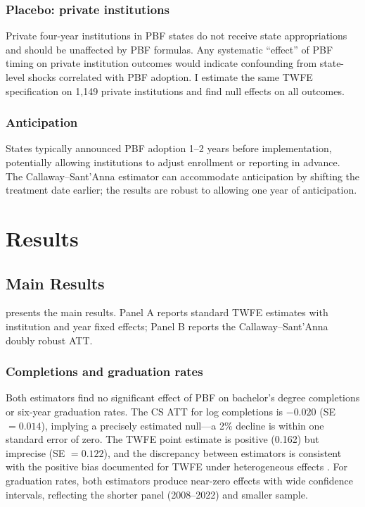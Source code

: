 \documentclass[12pt]{article}
\begin{document}
\subsubsection*{Placebo: private institutions} Private four-year institutions in PBF states do not receive state appropriations and should be unaffected by PBF formulas. Any systematic ``effect'' of PBF timing on private institution outcomes would indicate confounding from state-level shocks correlated with PBF adoption. I estimate the same TWFE specification on 1,149 private institutions and find null effects on all outcomes.

\subsubsection*{Anticipation} States typically announced PBF adoption 1--2 years before implementation, potentially allowing institutions to adjust enrollment or reporting in advance. The Callaway--Sant'Anna estimator can accommodate anticipation by shifting the treatment date earlier; the results are robust to allowing one year of anticipation.

\section{Results}

\subsection{Main Results}



 presents the main results. Panel A reports standard TWFE estimates with institution and year fixed effects; Panel B reports the Callaway--Sant'Anna doubly robust ATT.

\subsubsection*{Completions and graduation rates} Both estimators find no significant effect of PBF on bachelor's degree completions or six-year graduation rates. The CS ATT for log completions is $-0.020$ (SE $= 0.014$), implying a precisely estimated null---a 2\% decline is within one standard error of zero. The TWFE point estimate is positive (0.162) but imprecise (SE $= 0.122$), and the discrepancy between estimators is consistent with the positive bias documented for TWFE under heterogeneous effects \citep{goodman2021difference}. For graduation rates, both estimators produce near-zero effects with wide confidence intervals, reflecting the shorter panel (2008--2022) and smaller sample.
\end{document}
